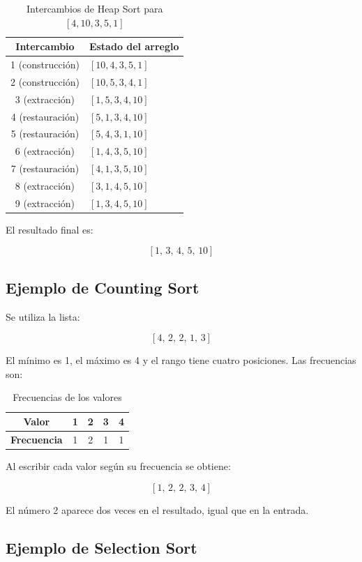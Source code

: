 \documentclass[12pt,a4paper]{article}
\begin{document}
\begin{table}[H]
\centering
\caption{Intercambios de Heap Sort para \([4,10,3,5,1]\)}
\begin{tabular}{cl}
\toprule
\textbf{Intercambio} & \textbf{Estado del arreglo} \\
\midrule
1 (construcción) & \([10,4,3,5,1]\) \\
2 (construcción) & \([10,5,3,4,1]\) \\
3 (extracción) & \([1,5,3,4,10]\) \\
4 (restauración) & \([5,1,3,4,10]\) \\
5 (restauración) & \([5,4,3,1,10]\) \\
6 (extracción) & \([1,4,3,5,10]\) \\
7 (restauración) & \([4,1,3,5,10]\) \\
8 (extracción) & \([3,1,4,5,10]\) \\
9 (extracción) & \([1,3,4,5,10]\) \\
\bottomrule
\end{tabular}
\end{table}

El resultado final es:

\[
\boxed{[1,\,3,\,4,\,5,\,10]}
\]

\subsection{Ejemplo de Counting Sort}

Se utiliza la lista:

\[
[4,\,2,\,2,\,1,\,3]
\]

El mínimo es 1, el máximo es 4 y el rango tiene cuatro posiciones. Las frecuencias son:

\begin{table}[H]
\centering
\caption{Frecuencias de los valores}
\begin{tabular}{ccccc}
\toprule
\textbf{Valor} & 1 & 2 & 3 & 4 \\
\midrule
\textbf{Frecuencia} & 1 & 2 & 1 & 1 \\
\bottomrule
\end{tabular}
\end{table}

Al escribir cada valor según su frecuencia se obtiene:

\[
\boxed{[1,\,2,\,2,\,3,\,4]}
\]

El número 2 aparece dos veces en el resultado, igual que en la entrada.

\subsection{Ejemplo de Selection Sort}
\end{document}
